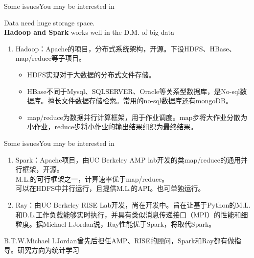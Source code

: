 \documentclass{beamer}
\begin{document}

\begin{frame}{Some issues}{\quad \quad \quad You may be interested in }

Data need huge storage space.\\
\textbf{Hadoop and Spark} works well in the D.M. of big data

\begin{block}{}
\begin{enumerate}
\item Hadoop：Apache的项目，分布式系统架构，开源。下设HDFS、HBase、map/reduce等子项目。
\begin{itemize}
 \item HDFS实现对于大数据的分布式文件存储。
 \item HBase不同于Mysql、SQLSERVER、Oracle等关系型数据库，是No-sql数据库。擅长文件数据存储检索。常用的no-sql数据库还有mongoDB。
 \item map/reduce为数据并行计算框架，用于作业调度。map步将大作业分散为小作业，reduce步将小作业的输出结果组织为最终结果。
\end{itemize}
\end{enumerate}
\end{block}
\end{frame}

\begin{frame}{Some issues}{\quad \quad \quad You may be interested in }

\begin{block}{}	%
\begin{enumerate}
\item Spark：Apache项目，由UC Berkeley AMP lab开发的类map/reduce的通用并行框架，开源。\\M.L.的可行框架之一，计算速率优于map/reduce。\\可以在HDFS中并行运行，且提供M.L.的API。也可单独运行。

\item Ray：由UC Berkeley RISE Lab开发，尚在开发中。旨在让基于Python的M.L.和D.L.工作负载能够实时执行，并具有类似消息传递接口（MPI）的性能和细粒度。据Michael I.Jordan说，Ray性能优于Spark，将取代Spark。
\end{enumerate}
\end{block}
B.T.W.\quad Michael I.Jordan曾先后担任AMP、RISE的顾问，Spark和Ray都有做指导。研究方向为统计学习

\end{frame}
\end{document}
